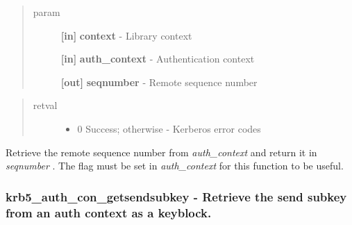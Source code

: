 \documentclass[letterpaper,10pt,english]{sphinxmanual}
\begin{document}
\begin{fulllineitems}
\label{appdev/refs/api/krb5_auth_con_getremoteseqnumber:c.krb5_auth_con_getremoteseqnumber}
\end{fulllineitems}

\begin{quote}\begin{description}
\item[{param}] \leavevmode
\textbf{{[}in{]}} \textbf{context} - Library context

\textbf{{[}in{]}} \textbf{auth\_context} - Authentication context

\textbf{{[}out{]}} \textbf{seqnumber} - Remote sequence number

\end{description}\end{quote}
\begin{quote}\begin{description}
\item[{retval}] \leavevmode\begin{itemize}
\item {} 
0   Success; otherwise - Kerberos error codes

\end{itemize}

\end{description}\end{quote}

Retrieve the remote sequence number from \emph{auth\_context} and return it in \emph{seqnumber} . The {\hyperref[appdev/refs/macros/KRB5_AUTH_CONTEXT_DO_SEQUENCE:KRB5_AUTH_CONTEXT_DO_SEQUENCE]{}} flag must be set in \emph{auth\_context} for this function to be useful.


\subsubsection{krb5\_auth\_con\_getsendsubkey -  Retrieve the send subkey from an auth context as a keyblock.}
\label{appdev/refs/api/krb5_auth_con_getsendsubkey:krb5-auth-con-getsendsubkey-retrieve-the-send-subkey-from-an-auth-context-as-a-keyblock}\label{appdev/refs/api/krb5_auth_con_getsendsubkey::doc}
\end{document}
